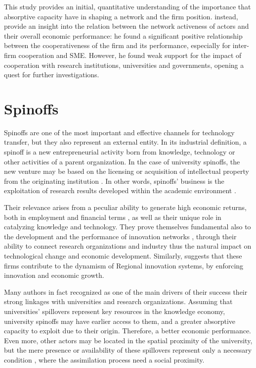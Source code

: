 This study provides an initial, quantitative understanding of the importance that absorptive capacity have in shaping a network and the firm position. \citet{Zeng2010} instead, provide an insight into the relation between the network activeness of actors and their overall economic performance: he found a significant positive relationship between the cooperativeness of the firm and its performance, especially for inter-firm cooperation and SME. However, he found weak support for the impact of cooperation with research institutions, universities and governments, opening a quest for further investigations.


\section{Spinoffs}

Spinoffs are one of the most important and effective channels for technology transfer, but they also represent an external entity. In its industrial definition, a spinoff is a new entrepreneurial activity born from knowledge, technology or other activities of a parent organization. In the case of university spinoffs, the new venture may be based on the licensing or acquisition of intellectual property from the originating institution \citep{Lockett2005a}. In other words, spinoffs' business is the exploitation of research results developed within the academic environment \citep{Rizzo2015}.

Their relevance arises from a peculiar ability to generate high economic returns, both in employment and financial terms \citep{OShea2004}, as well as their unique role in catalyzing knowledge and technology. They prove themselves fundamental also to the development and the performance of innovation networks \citep{Perez2003}, through their ability to connect research organizations and industry \citep{Rizzo2015} thus the natural impact on technological change and economic development. Similarly, \citet{Perez2003} suggests that these firms contribute to the dynamism of Regional innovation systems, by enforcing innovation and economic growth.

Many authors in fact recognized as one of the main drivers of their success their strong linkages with universities and research organizations. Assuming that universities' spillovers represent key resources in the knowledge economy, university spinoffs may have earlier access to them, and a greater absorptive capacity to exploit due to their origin. Therefore, a better economic performance. Even more, other actors may be located in the spatial proximity of the university, but the mere presence or availability of these spillovers represent only a necessary condition \citep{Colombo2010}, where the assimilation process need a social proximity.

